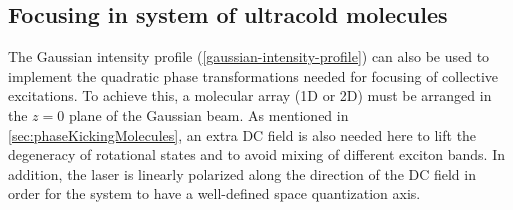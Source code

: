 \subsection{Focusing in system of ultracold molecules}
\label{sec:focusingMolecules}
The Gaussian intensity profile (\ref{gaussian-intensity-profile}) can also be used  to implement the quadratic phase 
transformations needed for focusing of collective excitations. 
To achieve this, a molecular array (1D or 2D) must be arranged in the $z=0$ plane of the Gaussian beam. As
 mentioned in \autoref{sec:phaseKickingMolecules}, an extra  DC field is also needed here to lift the degeneracy of 
rotational states and to avoid mixing of different exciton bands.  In addition, the laser is linearly polarized along the
 direction of the DC field in order for the system to have a well-defined space quantization axis. 


